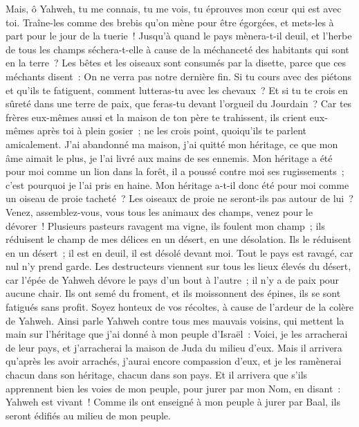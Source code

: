 \begin{multicols}{2}
Mais, ô Yahweh, tu me connais, tu me vois, tu éprouves mon cœur qui est avec toi. Traîne-les comme des brebis qu'on mène pour être égorgées, et mets-les à part pour le jour de la tuerie~!
Jusqu'à quand le pays mènera-t-il deuil, et l'herbe de tous les champs séchera-t-elle à cause de la méchanceté des habitants qui sont en la terre~? Les bêtes et les oiseaux sont consumés par la disette, parce que ces méchants disent~: On ne verra pas notre dernière fin.
Si tu cours avec des piétons et qu'ils te fatiguent, comment lutteras-tu avec les chevaux~? Et si tu te crois en sûreté dans une terre de paix, que feras-tu devant l'orgueil du Jourdain~?
 Car tes frères eux-mêmes aussi et la maison de ton père te trahissent, ils crient eux-mêmes après toi à plein gosier~; ne les crois point, quoiqu'ils te parlent amicalement.
J'ai abandonné ma maison, j'ai quitté mon héritage, ce que mon âme aimait le plus, je l'ai livré aux mains de ses ennemis.
Mon héritage a été pour moi comme un lion dans la forêt, il a poussé contre moi ses rugissements~; c'est pourquoi je l'ai pris en haine.
Mon héritage a-t-il donc été pour moi comme un oiseau de proie tacheté~? Les oiseaux de proie ne seront-ils pas autour de lui~? Venez, assemblez-vous, vous tous les animaux des champs, venez pour le dévorer~!
Plusieurs pasteurs ravagent ma vigne, ils foulent mon champ~; ils réduisent le champ de mes délices en un désert, en une désolation.
Ils le réduisent en un désert~; il est en deuil, il est désolé devant moi. Tout le pays est ravagé, car nul n'y prend garde.
Les destructeurs viennent sur tous les lieux élevés du désert, car l'épée de Yahweh dévore le pays d'un bout à l'autre~; il n'y a de paix pour aucune chair.
Ils ont semé du froment, et ils moissonnent des épines, ils se sont fatigués sans profit. Soyez honteux de vos récoltes, à cause de l'ardeur de la colère de Yahweh.
Ainsi parle Yahweh contre tous mes mauvais voisins, qui mettent la main sur l'héritage que j'ai donné à mon peuple d'Israël~: Voici, je les arracherai de leur pays, et j'arracherai la maison de Juda du milieu d'eux.
Mais il arrivera qu'après les avoir arrachés, j'aurai encore compassion d'eux, et je les ramènerai chacun dans son héritage, chacun dans son pays.
Et il arrivera que s'ils apprennent bien les voies de mon peuple, pour jurer par mon Nom, en disant~: Yahweh est vivant~! Comme ils ont enseigné à mon peuple à jurer par Baal, ils seront édifiés au milieu de mon peuple.

\end{multicols}

